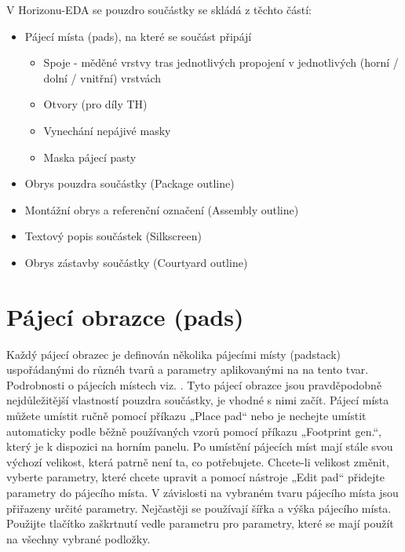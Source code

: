 \documentclass[letterpaper,10pt,czech]{sphinxmanual}
\begin{document}
V Horizonu-EDA se pouzdro součástky se skládá z těchto částí:
\begin{itemize}
\item {} 
Pájecí místa (pads), na které se součást připájí
\begin{itemize}
\item {} 
Spoje - měděné vrstvy tras jednotlivých propojení v jednotlivých (horní / dolní / vnitřní) vrstvách

\item {} 
Otvory (pro díly TH)

\item {} 
Vynechání nepájivé masky

\item {} 
Maska pájecí pasty

\end{itemize}

\item {} 
Obrys pouzdra součástky (Package outline)

\item {} 
Montážní obrys a referenční označení (Assembly outline)

\item {} 
Textový popis součástek (Silkscreen)

\item {} 
Obrys zástavby součástky (Courtyard outline)

\end{itemize}


\section{Pájecí obrazce (pads)}
\label{\detokenize{create-package_cz:pajeci-obrazce-pads}}
Každý pájecí obrazec je definován několika pájecími místy (padstack) uspořádanými do různéh tvarů a parametry aplikovanými na na tento tvar. Podrobnosti o pájecích místech viz.
{\hyperref[\detokenize{padstacks_cz::doc}]{}}. Tyto pájecí obrazce jsou pravděpodobně nejdůležitější vlastností pouzdra součástky, je vhodné s nimi začít. Pájecí místa můžete umístit ručně pomocí příkazu „Place pad“ nebo je nechejte umístit automaticky podle běžně používaných vzorů pomocí příkazu „Footprint gen.“, který je k dispozici na horním panelu. Po umístění pájecích míst mají stále svou výchozí velikost, která patrně není ta, co potřebujete. Chcete-li velikost změnit, vyberte parametry, které chcete upravit a pomocí nástroje „Edit pad“ přidejte parametry do pájecího místa. V závislosti na vybraném tvaru pájecího místa jsou přiřazeny určité parametry. Nejčastěji se používají šířka a výška pájecího místa. Použijte tlačítko zaškrtnutí vedle parametru pro parametry, které se mají použít na všechny vybrané podložky.
\end{document}

